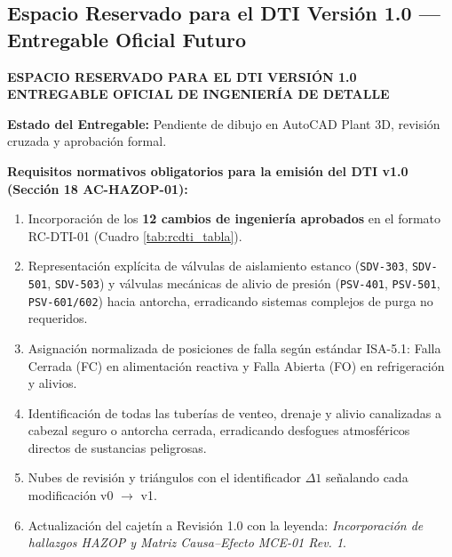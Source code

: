 \documentclass[10pt,letterpaper]{article}
\begin{document}
\subsection{Espacio Reservado para el DTI Versión 1.0 --- Entregable Oficial Futuro}
\begin{landscape}
\thispagestyle{fancy}
\begin{tcolorbox}[colframe=navyblue,colback=boxbg,arc=4mm,boxrule=1.5pt,height=0.90\textheight,valign=center]
    \centering
    {\huge \textbf{\color{navyblue} ESPACIO RESERVADO PARA EL DTI VERSIÓN 1.0}}\\[0.3cm]
    {\LARGE \textbf{\color{forestgreen} ENTREGABLE OFICIAL DE INGENIERÍA DE DETALLE}}\\[0.6cm]
    \begin{tcolorbox}[colframe=forestgreen,colback=white,arc=2mm,boxrule=1pt,width=0.75\linewidth]
        \centering\large
        \textbf{\color{forestgreen} Estado del Entregable:} Pendiente de dibujo en AutoCAD Plant 3D, revisión cruzada y aprobación formal.
    \end{tcolorbox}
    \vspace{0.8cm}
    \begin{minipage}{0.85\linewidth}
        \small
        \textbf{Requisitos normativos obligatorios para la emisión del DTI v1.0 (Sección 18 AC-HAZOP-01):}
        \begin{enumerate}
            \item Incorporación de los \textbf{12 cambios de ingeniería aprobados} en el formato RC-DTI-01 (Cuadro \ref{tab:rcdti_tabla}).
            \item Representación explícita de válvulas de aislamiento estanco (\texttt{SDV-303}, \texttt{SDV-501}, \texttt{SDV-503}) y válvulas mecánicas de alivio de presión (\texttt{PSV-401}, \texttt{PSV-501}, \texttt{PSV-601/602}) hacia antorcha, erradicando sistemas complejos de purga no requeridos.
            \item Asignación normalizada de posiciones de falla según estándar ISA-5.1: Falla Cerrada (FC) en alimentación reactiva y Falla Abierta (FO) en refrigeración y alivios.
            \item Identificación de todas las tuberías de venteo, drenaje y alivio canalizadas a cabezal seguro o antorcha cerrada, erradicando desfogues atmosféricos directos de sustancias peligrosas.
            \item Nubes de revisión y triángulos con el identificador $\Delta 1$ señalando cada modificación v0 $\to$ v1.
            \item Actualización del cajetín a Revisión 1.0 con la leyenda: \textit{Incorporación de hallazgos HAZOP y Matriz Causa--Efecto MCE-01 Rev. 1}.
        \end{enumerate}
    \end{minipage}
\end{tcolorbox}
\end{landscape}
\newpage
\end{document}
